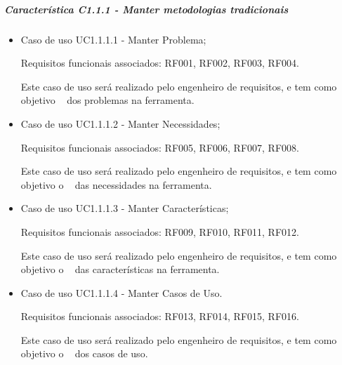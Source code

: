 	\subparagraph{Característica C1.1.1 - Manter metodologias tradicionais}
		\begin{itemize}
			
			\item Caso de uso UC1.1.1.1 - Manter Problema;
				
				Requisitos funcionais associados: RF001, RF002, RF003, RF004.

				Este caso de uso será realizado pelo engenheiro de requisitos, e tem como objetivo \CRUD~ dos problemas na ferramenta.
			
			\item Caso de uso UC1.1.1.2 - Manter Necessidades;
				
				Requisitos funcionais associados: RF005, RF006, RF007, RF008.

				Este caso de uso será realizado pelo engenheiro de requisitos, e tem como objetivo o \CRUD~ das necessidades na ferramenta.
			
			\item Caso de uso UC1.1.1.3 - Manter Características;
				
				Requisitos funcionais associados: RF009, RF010, RF011, RF012.

				Este caso de uso será realizado pelo engenheiro de requisitos, e tem como objetivo o \CRUD~ das características na ferramenta.
			
			\item Caso de uso UC1.1.1.4 - Manter Casos de Uso.
				
				Requisitos funcionais associados: RF013, RF014, RF015, RF016.

				Este caso de uso será realizado pelo engenheiro de requisitos, e tem como objetivo o \CRUD~ dos casos de uso.
		\end{itemize}
	
